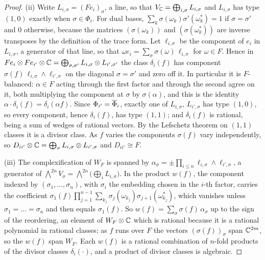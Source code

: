 \begin{proof}
(ii) Write $L_{i,\sigma}=(Fe_{i})_{\sigma}$, a line, so that
$V_{\mathbb{C}}=\bigoplus_{i,\sigma}L_{i,\sigma}$ and $L_{i,\sigma}$ has type $(1,0)$
exactly when $\sigma\in\Phi_{i}$. For dual bases,
$\sum_{k}\sigma(\omega_{k})\sigma'(\omega_{k}^{*})=1$ if $\sigma=\sigma'$ and
$0$ otherwise, because the matrices $(\sigma(\omega_{k}))$ and
$(\sigma(\omega_{k}^{*}))$ are inverse transposes by the definition of the
trace form. Let $\ell_{i,\sigma}$ be the component of $e_{i}$ in
$L_{i,\sigma}$, a generator of that line, so that
$\omega e_{i}=\sum_{\sigma}\sigma(\omega)\,\ell_{i,\sigma}$ for $\omega\in F$.
Hence in $Fe_{i}\otimes Fe_{i'}\otimes\mathbb{C}
=\bigoplus_{\sigma,\sigma'}L_{i,\sigma}\otimes L_{i',\sigma'}$ the class
$\delta_{i}(f)$ has component $\sigma(f)\,\ell_{i,\sigma}\wedge\ell_{i',\sigma}$
on the diagonal $\sigma=\sigma'$ and zero off it. In particular it is
$F$-balanced: $\alpha\in F$ acting through the first factor and through the
second agree on it, both multiplying the component at $\sigma$ by
$\sigma(\alpha)$, and this is the identity
$\alpha\cdot\delta_{i}(f)=\delta_{i}(\alpha f)$. Since $\Phi_{i'}=\overline{\Phi}_{i}$,
exactly one of $L_{i,\sigma}$, $L_{i',\sigma}$ has type $(1,0)$, so every
component, hence $\delta_{i}(f)$, has type $(1,1)$; and $\delta_{i}(f)$ is
rational, being a sum of wedges of rational vectors. By the Lefschetz theorem
on $(1,1)$ classes it is a divisor class. As $f$ varies the components
$\sigma(f)$ vary independently, so $D_{ii'}\otimes\mathbb{C}=\bigoplus_{\sigma}
L_{i,\sigma}\otimes L_{i',\sigma}$ and $D_{ii'}\cong F$.

(iii) The complexification of $W_{F}$ is spanned by
$\alpha_{\sigma}=\pm\prod_{i\le n}\ell_{i,\sigma}\wedge\ell_{i',\sigma}$, a
generator of $\bigwedge^{2n}V_{\sigma}=\bigwedge^{2n}\bigl(\bigoplus_{i}L_{i,\sigma}\bigr)$.
In the product $w(f)$, the component indexed by $(\sigma_{1},\dots,\sigma_{n})$,
with $\sigma_{i}$ the embedding chosen in the $i$-th factor, carries the
coefficient
$\sigma_{1}(f)\prod_{j=1}^{n-1}\sum_{k_{j}}\sigma_{j}(\omega_{k_{j}})\sigma_{j+1}(\omega_{k_{j}}^{*})$,
which vanishes unless $\sigma_{1}=\dots=\sigma_{n}$ and then equals
$\sigma_{1}(f)$. So $w(f)=\sum_{\sigma}\sigma(f)\,\alpha_{\sigma}$ up to the
sign of the reordering, an element of $W_{F}\otimes\mathbb{C}$ which is rational
because it is a rational polynomial in rational classes; as $f$ runs over
$F$ the vectors $(\sigma(f))_{\sigma}$ span $\mathbb{C}^{2m}$, so the $w(f)$ span
$W_{F}$. Each $w(f)$ is a rational combination of $n$-fold products of the
divisor classes $\delta_{i}(\cdot)$, and a product of divisor classes is
algebraic.
\end{proof}

